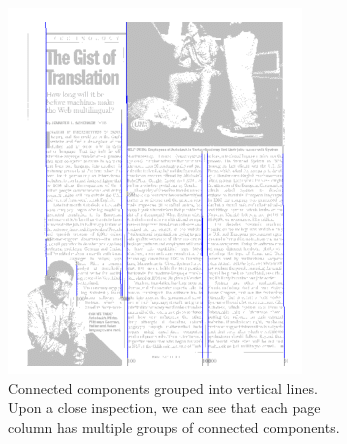 \begin{figure}[p]
\begin{subfigure}{0.30\textwidth}
\includegraphics[width=\linewidth]{img/tabStopDetection/tessPageSegm2.png}
\caption{Connected components grouped into vertical lines. Upon a close inspection, we can see that each page column has multiple groups of connected components.}
\label{fig:segmentationTesseract2}
\end{subfigure}
\quad
\begin{subfigure}{0.30\textwidth}

\end{subfigure}
\end{figure}
